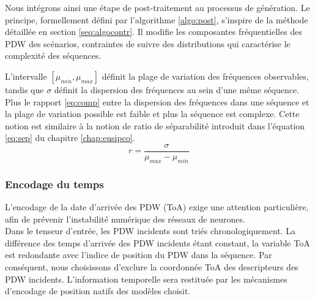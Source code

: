 Nous intégrons ainsi une étape de post-traitement au processus de génération. Le principe, formellement défini par l'algorithme \ref{algo:post}, s'inspire de la méthode détaillée en section \ref{seq:algocontr}. Il modifie les composantes fréquentielles des PDW des scénarios, contraintes de suivre des distributions qui caractérise le complexité des séquences. 

\begin{algorithm}[htbp]
\DontPrintSemicolon
\SetAlgoLined
{}
\caption{Ajustement de la séparabilité fréquentielle des scénarios d'entraînement}
\label{algo:post}
\end{algorithm}

L'intervalle $[\mu_{min}, \mu_{max}]$ définit la plage de variation des fréquences observables, tandis que $\sigma$ définit la dispersion des fréquences au sein d'une même séquence. Plus le rapport \eqref{eq:comp} entre la dispersion des fréquences dans une séquence et la plage de variation possible est faible et plus la séquence est complexe. Cette notion est similaire à la notion de ratio de séparabilité introduit dans l'équation \eqref{eq:sep} du chapitre \ref{chap:eusipco}.
\begin{equation}
\label{eq:comp}
r = \frac{\sigma}{\mu_{max} - \mu_{min}}
\end{equation}

\subsubsection{Encodage du temps}
\label{seq:timeencoding}
L'encodage de la date d'arrivée des PDW (ToA) exige une attention particulière, afin de prévenir l'instabilité numérique des réseaux de neurones.\\

Dans le tenseur d'entrée, les PDW incidents sont triés chronologiquement. La différence des temps d'arrivée des PDW incidents étant constant, la variable ToA est redondante avec l'indice de position du PDW dans la séquence. Par conséquent, nous choisissons d'exclure la coordonnée ToA des descripteurs des PDW incidents. L'information temporelle sera restituée par les mécanismes d'encodage de position natifs des modèles choisit.\\

